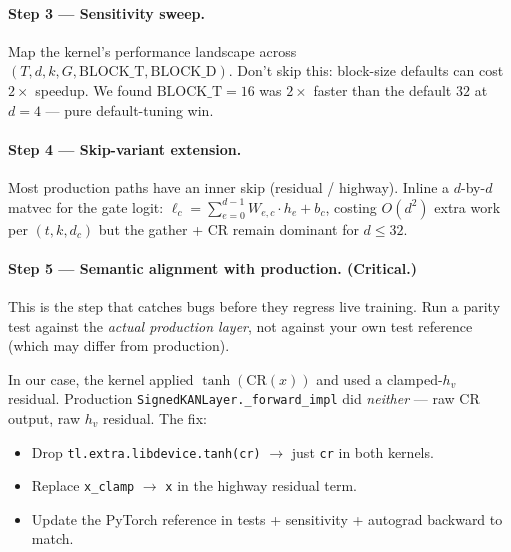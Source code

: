 \documentclass[11pt,a4paper]{article}
\begin{document}
\paragraph{Step 3 — Sensitivity sweep.}
Map the kernel's performance landscape across $(T, d, k, G, \mathrm{BLOCK\_T}, \mathrm{BLOCK\_D})$. Don't skip this: block-size defaults can cost $2\times$ speedup. We found $\mathrm{BLOCK\_T}=16$ was $2\times$ faster than the default $32$ at $d=4$ --- pure default-tuning win.

\paragraph{Step 4 — Skip-variant extension.}
Most production paths have an inner skip (residual / highway). Inline a $d$-by-$d$ matvec for the gate logit:
\(
\ell_{c} = \sum_{e=0}^{d-1} W_{e,c} \cdot h_{e} + b_{c}
\),
costing $O(d^2)$ extra work per $(t, k, d_c)$ but the gather + CR remain dominant for $d \le 32$.

\paragraph{Step 5 — Semantic alignment with production. \textbf{(Critical.)}}
This is the step that catches bugs before they regress live training. Run a parity test against the \emph{actual production layer}, not against your own test reference (which may differ from production).

\begin{center}
\end{center}

In our case, the kernel applied $\tanh(\mathrm{CR}(x))$ and used a clamped-$h_v$ residual. Production \texttt{SignedKANLayer.\_forward\_impl} did \emph{neither} --- raw CR output, raw $h_v$ residual. The fix:

\begin{itemize}[leftmargin=*]
  \item Drop \texttt{tl.extra.libdevice.tanh(cr)} $\to$ just \texttt{cr} in both kernels.
  \item Replace \texttt{x\_clamp} $\to$ \texttt{x} in the highway residual term.
  \item Update the PyTorch reference in tests + sensitivity + autograd backward to match.
\end{itemize}
\end{document}
